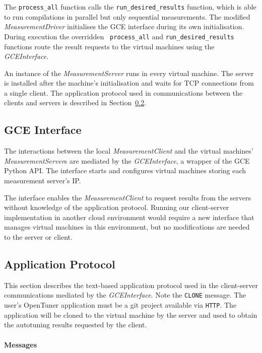 \documentclass[a4paper, 12pt]{article}
\begin{document}
The \texttt{\footnotesize process\_all} function calls the
\texttt{\footnotesize run\_desired\_results} function, which is able to run
compilations in parallel but only sequential measurements.  The modified
\emph{MeasurementDriver} initialises the GCE interface during its own
initialisation. During execution the overridden \texttt{\footnotesize
process\_all} and \texttt{\footnotesize run\_desired\_results} functions route
the result requests to the virtual machines using the \emph{GCEInterface}.

An instance of the \emph{MeasurementServer} runs in every virtual machine. The
server is installed after the machine's initialisation and waits for TCP
connections from a single client. The application protocol used in
communications between the clients and servers is described in
Section~\ref{sec:app}.

\subsection{GCE Interface}
\label{sec:gce}

The interactions between the local \emph{MeasurementClient} and the virtual
machines' \emph{MeasurementServer}s are mediated by the
\emph{GCEInterface}, a wrapper of the GCE Python API.
The interface starts and configures virtual machines
storing each measurement server's IP.

The interface enables the \emph{MeasurementClient} to request results from
the servers without knowledge of the application protocol. Running our
client-server implementation in another cloud environment would require a
new interface that manages virtual machines in this environment, but no
modifications are needed to the server or client.

\subsection{Application Protocol}
\label{sec:app}

This section describes the text-based application protocol used in the
client-server communications mediated by the \emph{GCEInterface}. Note the
\texttt{\footnotesize CLONE} message. The user's OpenTuner application must
be a git project available via \texttt{\footnotesize{HTTP}}. The application
will be cloned to the virtual machine by the server and used to obtain the
autotuning results requested by the client.

\paragraph{Messages}

\end{document}
